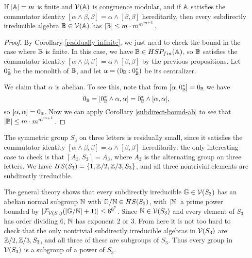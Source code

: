 \documentclass[letterpaper,11pt]{article}
\begin{document}
\begin{thm} If $|\mathbb{A}| = m$ is finite and $\mathcal{V}(\mathbb{A})$ is congruence modular, and if $\mathbb{A}$ satisfies the commutator identity $[\alpha \wedge \beta,\beta] = \alpha \wedge [\beta,\beta]$ hereditarily, then every subdirectly irreducible algebra $\mathbb{B} \in \mathcal{V}(\mathbb{A})$ has $|\mathbb{B}| \le m\cdot m^{m^{m+1}}$.
\end{thm}
\begin{proof} By Corollary \ref{residually-infinite}, we just need to check the bound in the case where $\mathbb{B}$ is finite. In this case, we have $\mathbb{B} \in HSP_{fin}(\mathbb{A})$, so $\mathbb{B}$ satisfies the commutator identity $[\alpha \wedge \beta,\beta] = \alpha \wedge [\beta,\beta]$ by the previous propositions. Let $0_{\mathbb{B}}^*$ be the monolith of $\mathbb{B}$, and let $\alpha = (0_{\mathbb{B}}:0_{\mathbb{B}}^*)$ be its centralizer.

We claim that $\alpha$ is abelian. To see this, note that from $[\alpha,0_{\mathbb{B}}^*] = 0_{\mathbb{B}}$ we have
\[
0_{\mathbb{B}} = [0_{\mathbb{B}}^*\wedge \alpha,\alpha] = 0_{\mathbb{B}}^*\wedge [\alpha,\alpha],
\]
so $[\alpha,\alpha] = 0_{\mathbb{B}}$. Now we can apply Corollary \ref{subdirect-bound-ab} to see that $|\mathbb{B}| \le m\cdot m^{m^{m+1}}$.%
\end{proof}

\begin{ex} The symmetric group $S_3$ on three letters is residually small, since it satisfies the commutator identity $[\alpha \wedge \beta, \beta] = \alpha \wedge [\beta,\beta]$ hereditarily: the only interesting case to check is that $[A_3,S_3] = A_3$, where $A_3$ is the alternating group on three letters. We have $HS(S_3) = \{1, \mathbb{Z}/2, \mathbb{Z}/3, S_3\}$, and all three nontrivial elements are subdirectly irreducible.

The general theory shows that every subdirectly irreducible $\mathbb{G} \in \mathcal{V}(S_3)$ has an abelian normal subgroup $\mathbb{N}$ with $\mathbb{G}/\mathbb{N} \in HS(S_3)$, with $|\mathbb{N}|$ a prime power bounded by $|\mathcal{F}_{\mathcal{V}(S_3)}(|\mathbb{G}/\mathbb{N}|+1)| \le 6^{6^7}$. Since $\mathbb{N} \in \mathcal{V}(S_3)$ and every element of $S_3$ has order dividing $6$, $\mathbb{N}$ has exponent $2$ or $3$. From here it is not too hard to check that the only nontrivial subdirectly irreducible algebras in $\mathcal{V}(S_3)$ are $\mathbb{Z}/2,\mathbb{Z}/3, S_3$, and all three of these are subgroups of $S_3$. Thus every group in $\mathcal{V}(S_3)$ is a subgroup of a power of $S_3$.
\end{ex}
\end{document}
